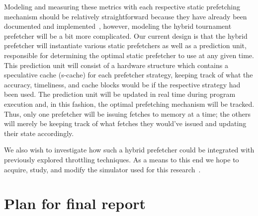 \documentclass[pageno]{jpaper}
\begin{document}
Modeling and measuring these metrics with each respective static prefetching mechanism should be 
relatively straightforward because they have already been documented and implemented~\cite{srinath07}, however, 
modeling the hybrid tournament prefetcher will be a bit more complicated. Our current design is 
that the hybrid prefetcher will instantiate various static prefetchers as well as a prediction unit, 
responsible for determining the optimal static prefetcher to use at any given time. This prediction unit 
will consist of a hardware structure which contains a speculative cache (s-cache) for each prefetcher 
strategy, keeping track of what the accuracy, timeliness, and cache blocks would be if the respective 
strategy had been used. The prediction unit will be updated in real time during program execution and, 
in this fashion, the optimal prefetching mechanism will be tracked. Thus, only one prefetcher will be 
issuing fetches to memory at a time; the others will merely be keeping track of what fetches they would’ve 
issued and updating their state accordingly.

We also wish to investigate how such a hybrid prefetcher could be integrated with previously explored throttling 
techniques. As a means to this end we hope to acquire, study, and modify the simulator used for this research~\cite{srinath07}.

\newpage
\section{Plan for final report}
\end{document}
